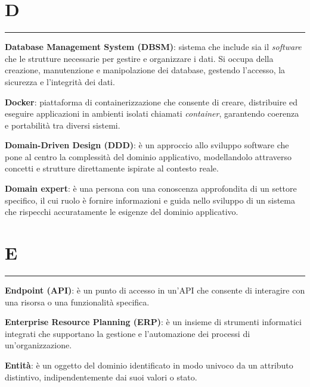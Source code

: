 \section*{D}
{\color{lightgray}\rule{\textwidth}{0.4pt}} %
\begin{glossaryitemize}
    \item \textbf{Database Management System (DBSM)}: sistema che include sia il \textit{software} che le strutture necessarie per gestire e organizzare i dati. Si occupa della creazione, manutenzione e manipolazione dei database, gestendo l'accesso, la sicurezza e l'integrità dei dati.
    \item \textbf{Docker}: piattaforma di containerizzazione che consente di creare, distribuire ed eseguire applicazioni in ambienti isolati chiamati \textit{container}, garantendo coerenza e portabilità tra diversi sistemi.
    \item \textbf{Domain-Driven Design (DDD)}: è un approccio allo sviluppo software che pone al centro la complessità del dominio applicativo, modellandolo attraverso concetti e strutture direttamente ispirate al contesto reale.
    \item \textbf{Domain expert}: è una persona con una conoscenza approfondita di un settore specifico, il cui ruolo è fornire informazioni e guida nello sviluppo di un sistema che rispecchi accuratamente le esigenze del dominio applicativo.
\end{glossaryitemize}

\section*{E}
{\color{lightgray}\rule{\textwidth}{0.4pt}} %
\begin{glossaryitemize}
    \item \textbf{Endpoint (API)}:  è un punto di accesso in un'API che consente di interagire con una risorsa o una funzionalità specifica.
    \item \textbf{Enterprise Resource Planning (ERP)}: è un insieme di strumenti informatici integrati che supportano la gestione e l'automazione dei processi di un'organizzazione. 
    \item \textbf{Entità}: è un oggetto del dominio identificato in modo univoco da un attributo distintivo, indipendentemente dai suoi valori o stato.
\end{glossaryitemize}

